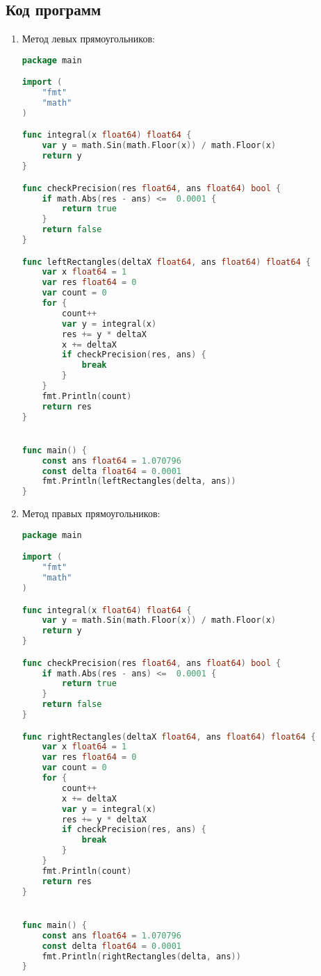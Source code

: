 \documentclass[a4paper, 14pt, titlepage, fleqn]{extarticle}
\begin{document}
		\subsection*{Код программ}
		\begin{enumerate}
			\item Метод левых прямоугольников:			
				\begin{lstlisting}[language=Go]
package main

import (
	"fmt"
	"math"
)

func integral(x float64) float64 {
    var y = math.Sin(math.Floor(x)) / math.Floor(x)
    return y
}

func checkPrecision(res float64, ans float64) bool {
    if math.Abs(res - ans) <=  0.0001 {
        return true
    }
    return false
}

func leftRectangles(deltaX float64, ans float64) float64 {
    var x float64 = 1
    var res float64 = 0
    var count = 0
    for {
        count++
        var y = integral(x)
        res += y * deltaX
        x += deltaX
        if checkPrecision(res, ans) {
            break
        }
    }
    fmt.Println(count)
    return res
}


func main() {
    const ans float64 = 1.070796
    const delta float64 = 0.0001 
    fmt.Println(leftRectangles(delta, ans))
}
				\end{lstlisting}

			\pagebreak
			\item Метод правых прямоугольников:
				\begin{lstlisting}[language=Go]
package main

import (
	"fmt"
	"math"
)

func integral(x float64) float64 {
    var y = math.Sin(math.Floor(x)) / math.Floor(x)
    return y
}

func checkPrecision(res float64, ans float64) bool {
    if math.Abs(res - ans) <=  0.0001 {
        return true
    }
    return false
}

func rightRectangles(deltaX float64, ans float64) float64 {
    var x float64 = 1
    var res float64 = 0
    var count = 0
    for {
        count++
        x += deltaX
        var y = integral(x)
        res += y * deltaX
        if checkPrecision(res, ans) {
            break
        }
    }
    fmt.Println(count)
    return res
}


func main() {
    const ans float64 = 1.070796
    const delta float64 = 0.0001 
    fmt.Println(rightRectangles(delta, ans))
}
				\end{lstlisting}


\end{enumerate}
\end{document}
